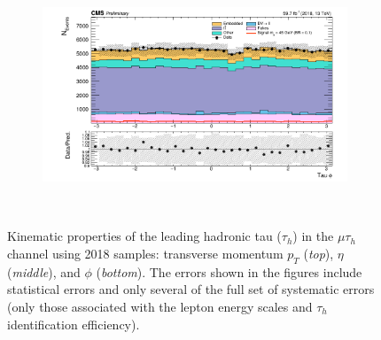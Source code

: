 \begin{figure}[ht]
\begin{subfigure}{0.75\textwidth}
    \end{subfigure} \\
    \begin{subfigure}{0.75\textwidth}
        \includegraphics[width=1.0\textwidth]{figures/ch-11-asymmetric/mutau_phi_2.png}
    \end{subfigure} \\ 
    \caption{Kinematic properties of the leading hadronic tau ($\tau_{h}$) in the $\mu\tau_{h}$ channel using 2018 samples: transverse momentum $p_T$ (\textit{top}), $\eta$ (\textit{middle}), and $\phi$ (\textit{bottom}). The errors shown in the figures include statistical errors and only several of the full set of systematic errors (only those associated with the lepton energy scales and $\tau_{h}$ identification efficiency).}
    \label{fig:nanoAOD_mutau_control_plots_leading_tauh}
\end{figure}


